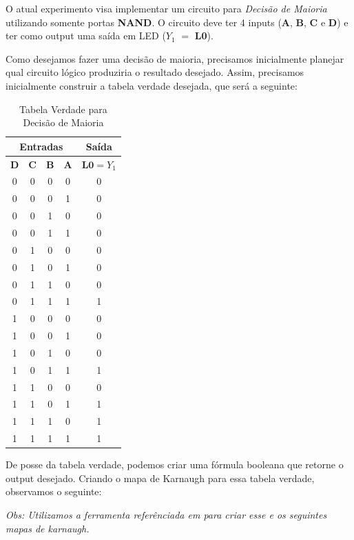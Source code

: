 \documentclass[12pt]{article}
\begin{document}
O atual experimento visa implementar um circuito para \textit{Decisão de
Maioria} utilizando somente portas \textbf{NAND}. O circuito deve ter 4 inputs
(\textbf{A}, \textbf{B}, \textbf{C} e \textbf{D}) e ter como output uma saída em
LED (\(Y_{1}\) \( = \) \textbf{L0}).

Como desejamos fazer uma decisão de maioria, precisamos inicialmente planejar
qual circuito lógico produziria o resultado desejado. Assim, precisamos
inicialmente construir a tabela verdade desejada, que será a seguinte:

\begin{table}[H]
    \centering
    \caption{Tabela Verdade para Decisão de Maioria}
    \begin{tabular}{|c|c|c|c|c|}\hline
    \multicolumn{4}{|c|}{Entradas} & \multicolumn{1}{|c|}{Saída} \\\hline
    \textbf{D} & \textbf{C} & \textbf{B} & \textbf{A} & $\textbf{L0}=Y_{1}$ \\\hline
    0 & 0 & 0 & 0 & 0 \\\hline
    0 & 0 & 0 & 1 & 0 \\\hline
    0 & 0 & 1 & 0 & 0 \\\hline
    0 & 0 & 1 & 1 & 0 \\\hline
    0 & 1 & 0 & 0 & 0 \\\hline
    0 & 1 & 0 & 1 & 0 \\\hline
    0 & 1 & 1 & 0 & 0 \\\hline
    0 & 1 & 1 & 1 & 1 \\\hline
    1 & 0 & 0 & 0 & 0 \\\hline
    1 & 0 & 0 & 1 & 0 \\\hline
    1 & 0 & 1 & 0 & 0 \\\hline
    1 & 0 & 1 & 1 & 1 \\\hline
    1 & 1 & 0 & 0 & 0 \\\hline
    1 & 1 & 0 & 1 & 1 \\\hline
    1 & 1 & 1 & 0 & 1 \\\hline
    1 & 1 & 1 & 1 & 1 \\\hline
    \end{tabular}\label{tab:tabela_and}
\end{table}

De posse da tabela verdade, podemos criar uma fórmula booleana que retorne o
output desejado. Criando o mapa de Karnaugh para essa tabela verdade, observamos
o seguinte:

\emph{Obs: Utilizamos a ferramenta referênciada em \cite{karnaugh_generator} para
criar esse e os seguintes mapas de karnaugh.}
\end{document}
